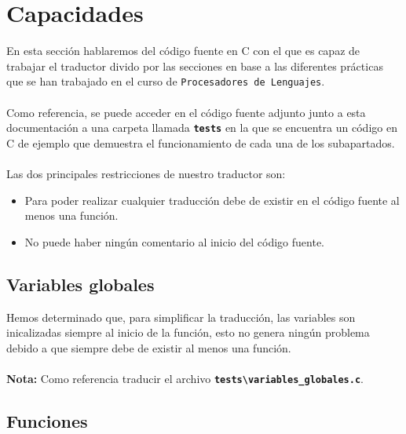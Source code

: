 \documentclass[]{article}
\begin{document}
        \section{Capacidades}
        En esta sección hablaremos del código fuente en C con el que es capaz de trabajar el traductor divido por las secciones en base a las diferentes prácticas que se han trabajado en el curso de \texttt{Procesadores de Lenguajes}. \\\\ Como referencia, se puede acceder en el código fuente adjunto junto a esta documentación a una carpeta llamada \texttt{\textbf{tests}} en la que se encuentra un código en C de ejemplo que demuestra el funcionamiento de cada una de los subapartados. \\\\ Las dos principales restricciones de nuestro traductor son: \\ \begin{itemize}
        \item Para poder realizar cualquier traducción debe de existir en el código fuente al menos una función.
        \item No puede haber ningún comentario al inicio del código fuente. \\
        \end{itemize}

        \subsection{Variables globales}
        Hemos determinado que, para simplificar la traducción, las variables son inicalizadas siempre al inicio de la función, esto no genera ningún problema debido a que siempre debe de existir al menos una función. \\\\ \textbf{Nota:} Como referencia traducir el archivo \texttt{\textbf{tests\textbackslash variables\_{globales.c}}}.

        \subsection{Funciones}
        
        
\end{document}
